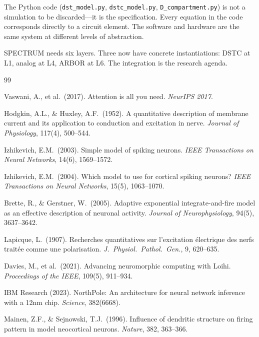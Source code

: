 \documentclass[12pt]{article}
\begin{document}
The Python code (\texttt{dst\_model.py}, \texttt{dstc\_model.py}, \texttt{D\_compartment.py}) is not a simulation to be discarded---it is the specification. Every equation in the code corresponds directly to a circuit element. The software and hardware are the same system at different levels of abstraction.

SPECTRUM needs six layers. Three now have concrete instantiations: DSTC at L1, analog at L4, ARBOR at L6. The integration is the research agenda.

\begin{thebibliography}{99}

 Vaswani, A., et al.\ (2017). Attention is all you need. \textit{NeurIPS 2017}.

 Hodgkin, A.L., \& Huxley, A.F.\ (1952). A quantitative description of membrane current and its application to conduction and excitation in nerve. \textit{Journal of Physiology}, 117(4), 500--544.

 Izhikevich, E.M.\ (2003). Simple model of spiking neurons. \textit{IEEE Transactions on Neural Networks}, 14(6), 1569--1572.

 Izhikevich, E.M.\ (2004). Which model to use for cortical spiking neurons? \textit{IEEE Transactions on Neural Networks}, 15(5), 1063--1070.

 Brette, R., \& Gerstner, W.\ (2005). Adaptive exponential integrate-and-fire model as an effective description of neuronal activity. \textit{Journal of Neurophysiology}, 94(5), 3637--3642.

 Lapicque, L.\ (1907). Recherches quantitatives sur l'excitation \'{e}lectrique des nerfs trait\'{e}e comme une polarisation. \textit{J.\ Physiol.\ Pathol.\ Gen.}, 9, 620--635.

 Davies, M., et al.\ (2021). Advancing neuromorphic computing with Loihi. \textit{Proceedings of the IEEE}, 109(5), 911--934.

 IBM Research (2023). NorthPole: An architecture for neural network inference with a 12nm chip. \textit{Science}, 382(6668).

 Mainen, Z.F., \& Sejnowski, T.J.\ (1996). Influence of dendritic structure on firing pattern in model neocortical neurons. \textit{Nature}, 382, 363--366.


\end{thebibliography}
\end{document}

